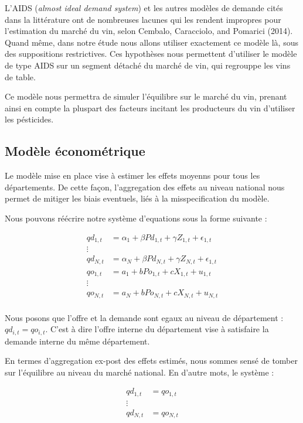 \documentclass[11pt,]{article}
\begin{document}
L'AIDS (\emph{almost ideal demand system}) et les autres modèles de
demande cités dans la littérature ont de nombreuses lacunes qui les
rendent impropres pour l'estimation du marché du vin, selon Cembalo,
Caracciolo, and Pomarici (2014). Quand même, dans notre étude nous
allons utiliser exactement ce modèle là, sous des suppositions
restrictives. Ces hypothèses nous permettent d'utiliser le modèle de
type AIDS sur un segment détaché du marché de vin, qui regrouppe les
vins de table.

Ce modèle nous permettra de simuler l'équilibre sur le marché du vin,
prenant ainsi en compte la pluspart des facteurs incitant les
producteurs du vin d'utiliser les pésticides.

\hypertarget{modele-econometrique}{%
\subsection{Modèle économétrique}\label{modele-econometrique}}

Le modèle mise en place vise à estimer les effets moyenns pour tous les
départements. De cette façon, l'aggregation des effets au niveau
national nous permet de mitiger les biais eventuels, liés à la
misspecification du modèle.

Nous pouvons réécrire notre système d'equations sous la forme suivante :

\begin{align*}
  qd_{1,t} & = \alpha_{1} + \beta Pd_{1,t} + \gamma Z_{1,t} + \epsilon_{1,t}  \\
  \vdots \\ 
  qd_{N,t} & = \alpha_{N} + \beta Pd_{N,t} + \gamma Z_{N,t} + \epsilon_{1,t}  \\
  qo_{1,t} & = a_1 + b Po_{1,t} + c X_{1,t} + u_{1,t} \\ 
  \vdots \\ 
  qo_{N,t} & = a_N + b Po_{N,t} + c X_{N,t} + u_{N,t} \\
\end{align*}

Nous posons que l'offre et la demande sont egaux au niveau de
département : \(qd_{i,t} = qo_{i,t}\). C'est à dire l'offre interne du
département vise à satisfaire la demande interne du même département.

En termes d'aggregation ex-post des effets estimés, nous sommes sensé de
tomber sur l'équilibre au niveau du marché national. En d'autre mots, le
système :

\begin{align*}
  qd_{1,t} & = qo_{1,t} \\
  \vdots \\ 
  qd_{N,t} & = qo_{N,t} \\
\end{align*}
\end{document}
